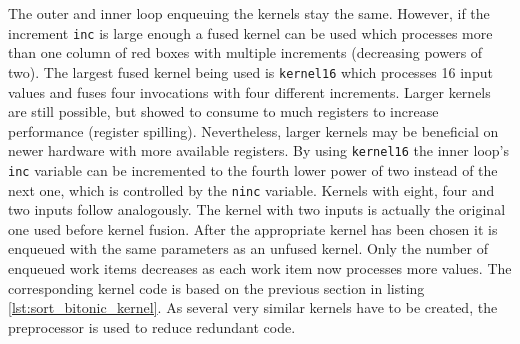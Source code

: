 The outer and inner loop enqueuing the kernels stay the same. However, if the increment \lstinline!inc! is large enough a fused kernel can be used which processes more than one column of red boxes with multiple increments (decreasing powers of two). The largest fused kernel being used is \lstinline!kernel16! which processes 16 input values and fuses four invocations with four different increments. Larger kernels are still possible, but showed to consume to much registers to increase performance (register spilling). Nevertheless, larger kernels may be beneficial on newer hardware with more available registers. By using \lstinline!kernel16! the inner loop's \lstinline!inc! variable can be incremented to the fourth lower power of two instead of the next one, which is controlled by the \lstinline!ninc! variable. Kernels with eight, four and two inputs follow analogously. The kernel with two inputs is actually the original one used before kernel fusion.
After the appropriate kernel has been chosen it is enqueued with the same parameters as an unfused kernel. Only the number of enqueued work items decreases as each work item now processes more values.
The corresponding kernel code is based on the previous section in listing \ref{lst:sort_bitonic_kernel}. As several very similar kernels have to be created, the preprocessor is used to reduce redundant code.



